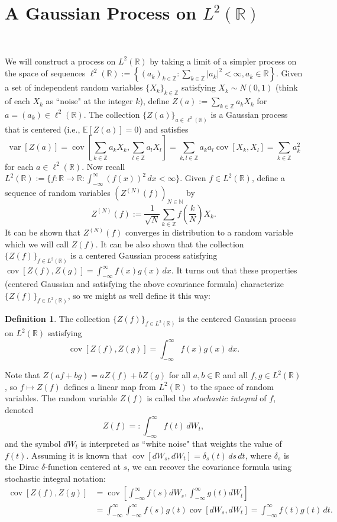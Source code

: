 \documentclass{article}
\newcommand{\Z}{\mathbb{Z}}    %
\newcommand{\N}{\mathbb{N}}    %
\newcommand{\R}{\mathbb{R}}    %
\newcommand{\E}{\mathbb{E}}    %
\DeclareMathOperator{\var}{var}
\DeclareMathOperator{\cov}{cov}
\theoremstyle{definition}
\newtheorem{defn}[thm]{Definition}
\begin{document}

\section{A Gaussian Process on $L^2(\R)$}\

We will construct a process on $L^2(\R)$ by taking a limit of a simpler process on the space of sequences $\ell^2(\R):=\left\{(a_k)_{k\in\Z}:\sum_{k\in\Z}|a_k|^2<\infty,a_k\in\R\right\}$. Given a set of independent random variables $\{X_k\}_{k\in\Z}$ satisfying $X_k\sim N(0,1)$ (think of each $X_k$ as ``noise" at the integer $k$), define $Z(a):=\sum_{k\in\Z}a_kX_k$ for $a=(a_k)\in\ell^2(\R)$. The collection $\{Z(a)\}_{a\in\ell^2(\R)}$ is a Gaussian process that is centered (i.e., $\E[Z(a)]=0$) and satisfies $$\var[Z(a)]=\cov\left[\sum_{k\in\Z}a_kX_k,\sum_{l\in\Z}a_lX_l\right]=\sum_{k,l\in\Z}a_ka_l\cov[X_k,X_l]=\sum_{k\in\Z}a_k^2$$ for each $a\in\ell^2(\R)$. Now recall $L^2(\R):=\{f:\R\to\R:\int_{-\infty}^\infty(f(x))^2\,dx<\infty\}$. Given $f\in L^2(\R)$, define a sequence of random variables $(Z^{(N)}(f))_{N\in\N}$ by $$Z^{(N)}(f):=\frac{1}{\sqrt{N}}\sum_{k\in\Z}f\left(\frac{k}{N}\right)X_k.$$ It can be shown that $Z^{(N)}(f)$ converges in distribution to a random variable which we will call $Z(f)$. It can be also shown that the collection $\{Z(f)\}_{f\in L^2(\R)}$ is a centered Gaussian process satisfying $\cov[Z(f),Z(g)]=\int_{-\infty}^\infty f(x)g(x)\,dx$. It turns out that these properties (centered Gaussian and satisfying the above covariance formula) characterize $\{Z(f)\}_{f\in L^2(\R)}$, so we might as well define it this way:

\begin{defn}
The collection $\{Z(f)\}_{f\in L^2(\R)}$ is the centered Gaussian process on $L^2(\R)$ satisfying $$\cov[Z(f),Z(g)]=\int_{-\infty}^\infty f(x)g(x)\,dx.$$
\end{defn} 

Note that $Z(af+bg)=aZ(f)+bZ(g)$ for all $a,b\in\R$ and all $f,g\in L^2(\R)$, so $f\mapsto Z(f)$ defines a linear map from $L^2(\R)$ to the space of random variables. The random variable $Z(f)$ is called the \emph{stochastic integral} of $f$, denoted $$Z(f)=:\int_{-\infty}^\infty f(t)\,dW_t,$$ and the symbol $dW_t$ is interpreted as ``white noise" that weights the value of $f(t)$. Assuming it is known that $\cov[dW_s,dW_t]=\delta_s(t)\,ds\,dt$, where $\delta_s$ is the Dirac $\delta$-function centered at $s$, we can recover the covariance formula using stochastic integral notation:
\begin{align*}
\cov[Z(f),Z(g)]&=\cov\left[\int_{-\infty}^\infty f(s)dW_s,\int_{-\infty}^\infty g(t)dW_t\right]\\
&=\int_{-\infty}^\infty\int_{-\infty}^\infty f(s)g(t)\cov[dW_s,dW_t]=\int_{-\infty}^\infty f(t)g(t)\,dt.
\end{align*}
\end{document}
